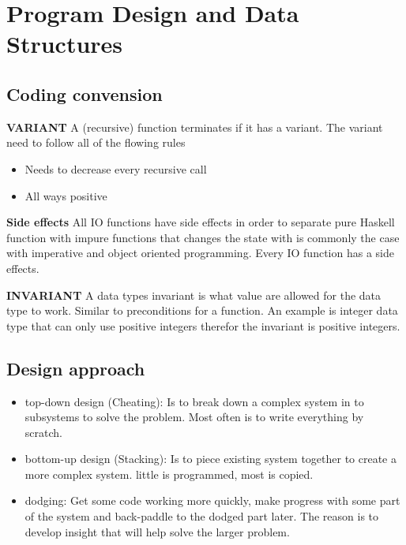 \chapter{Program Design and Data Structures}

\newpage


\begin{multicols}{2}
\section{Coding convension}
\noindent\textbf{VARIANT} \newline
A (recursive) function terminates if it has a variant.
The variant need to follow all of the flowing rules

\begin{itemize}
\item Needs to decrease every recursive call
\item All ways positive
\end{itemize} 

\noindent\textbf{Side effects} \newline
All IO functions have side effects in order to separate pure Haskell function with impure functions
that changes the state with is commonly the case with imperative and object oriented programming.
Every IO function has a side effects.

\noindent\textbf{INVARIANT} \newline
A data types invariant is what value are allowed for the data type to work. Similar to preconditions for
a function. An example is integer data type that can only use positive integers therefor the
invariant is positive integers.



\section{Design approach}
\begin{itemize}
\item top-down design (Cheating): Is to break down a complex system in to subsystems to solve the problem.
  Most often is to write everything by scratch.
\item bottom-up design (Stacking): Is to piece existing system together to create a more complex system.
  little is programmed, most is copied.
\item dodging: Get some code working more quickly, make progress with some part of the system
  and back-paddle to the dodged part later. The reason is to develop insight that will help solve
  the larger problem.
\end{itemize}



\end{multicols}
